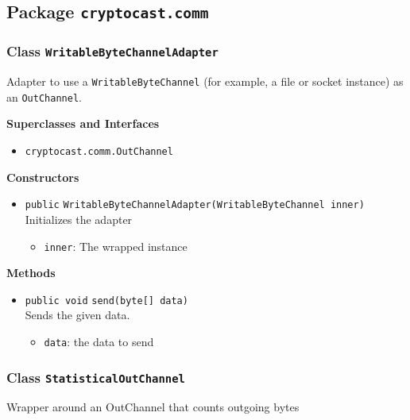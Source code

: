 \subsection{Package \lstinline!cryptocast.comm!}

\subsubsection{Class \lstinline|WritableByteChannelAdapter|}
Adapter to use a \lstinline|WritableByteChannel| (for example, a file or socket instance) as
 an \lstinline|OutChannel|. \\



\textbf{Superclasses and Interfaces}
\begin{itemize}
\item \lstinline|cryptocast.comm.OutChannel|
\end{itemize}



\textbf{Constructors}
\begin{itemize}
\item \lstinline|public| \lstinline|WritableByteChannelAdapter|\lstinline|(WritableByteChannel inner)|\\
Initializes the adapter
\begin{itemize}
\item \lstinline|inner|: The wrapped instance
\end{itemize}



\end{itemize}


\textbf{Methods}
\begin{itemize}
\item \lstinline|public void| \lstinline|send|\lstinline|(byte[] data)|\\
Sends the given data.
\begin{itemize}
\item \lstinline|data|: the data to send
\end{itemize}



\end{itemize}

\subsubsection{Class \lstinline|StatisticalOutChannel|}
Wrapper around an OutChannel that counts outgoing bytes \\



